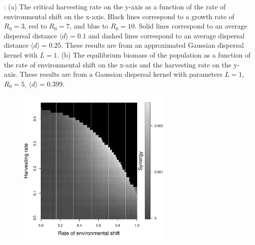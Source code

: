 \documentclass[12pt,english]{article}
\begin{document}
\begin{figure}[htbp]
\caption{%
}

\label{baseline}
\end{figure}

\pagebreak

: (a) The critical harvesting rate on the y-axis as a function of the rate of environmental shift on the x-axis.  Black lines correspond to a growth rate of $R_0=3$, red to $R_0=7$, and blue to $R_0=10$.  Solid lines correspond to an average dispersal distance $\langle d \rangle =0.1$ and dashed lines correspond to an average dispersal distance $\langle d \rangle =0.25$.  These results are from an approximated Gaussian dispersal kernel with $L=1$.  (b) The equilibrium biomass of the population as a function of the rate of environmental shift on the x-axis and the harvesting rate on the y-axis. These results are from a Gaussian dispersal kernel with parameters $L=1$, $R_0=5$, $\langle d \rangle = 0.399$.  

\pagebreak

\begin{figure}[htbp]
\begin{center}
\includegraphics[width=3in]{plots/synergy.pdf}
\caption{
}
\label{Synergy}
\end{center}
\end{figure}
\end{document}

